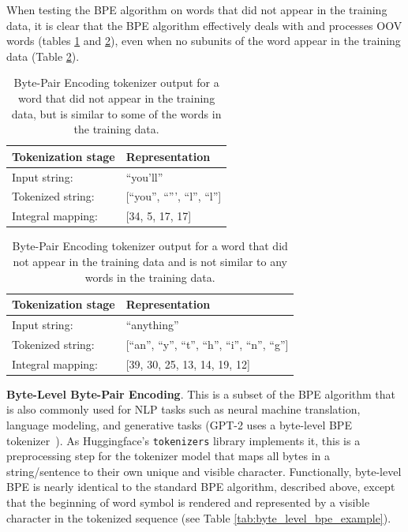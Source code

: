 \documentclass[12pt]{article}
\begin{document}
When testing the BPE algorithm on words that did not appear in the training data, it is clear that the BPE algorithm effectively deals with and
processes OOV words (tables \ref{tab:bpe_unk_similar} and \ref{tab:bpe_unk}), even when no subunits of the word appear in the training data (Table
\ref{tab:bpe_unk}).

\begin{table}[!t]
    \centering
    \begin{tabular}{l l}
        \toprule
        Tokenization stage & Representation                 \\
        \midrule
        Input string:      & ``you'll''                     \\
        Tokenized string:  & [``you'', ``''', ``l'', ``l''] \\
        Integral mapping:  & [34, 5, 17, 17]                \\
        \bottomrule
    \end{tabular}
    \caption{Byte-Pair Encoding tokenizer output for a word that did not appear in the training data, but is similar to some of the words in the
        training data.}
    \label{tab:bpe_unk_similar}
\end{table}

\begin{table}[!t]
    \centering
    \begin{tabular}{l l}
        \toprule
        Tokenization stage & Representation                                     \\
        \midrule
        Input string:      & ``anything''                                       \\
        Tokenized string:  & [``an'', ``y'', ``t'', ``h'', ``i'', ``n'', ``g''] \\
        Integral mapping:  & [39, 30, 25, 13, 14, 19, 12]                       \\
        \bottomrule
    \end{tabular}
    \caption{Byte-Pair Encoding tokenizer output for a word that did not appear in the training data and is not similar to any words in the training
        data.}
    \label{tab:bpe_unk}
\end{table}

\textbf{Byte-Level Byte-Pair Encoding}. This is a subset of the BPE algorithm that is also commonly used for NLP tasks such as neural machine translation, language modeling, and generative tasks (GPT-2 uses a byte-level BPE tokenizer~\cite{radford_language_2019}). As Huggingface's \lstinline|tokenizers| library implements it, this is a preprocessing step for the tokenizer model that maps all bytes in a string/sentence to their own unique and visible character. Functionally, byte-level BPE is nearly identical to the standard BPE algorithm, described above, except that the beginning of word symbol is rendered and represented by a visible character in the tokenized sequence (see Table \ref{tab:byte_level_bpe_example}).
\end{document}
